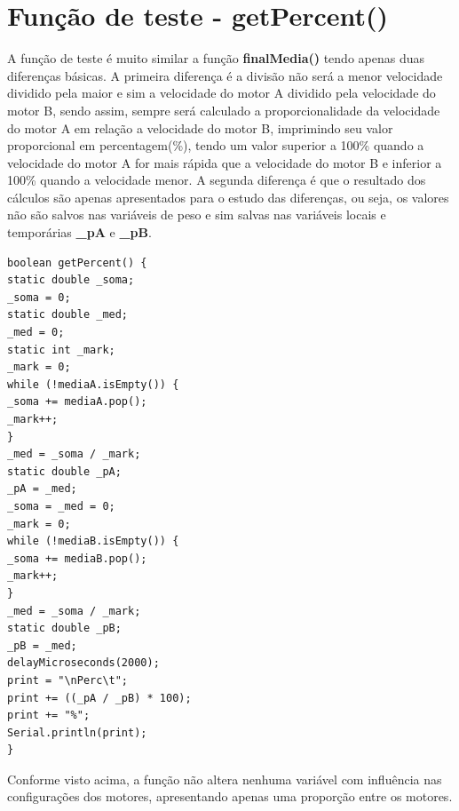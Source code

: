 \documentclass[a4paper,12pt,portuguese]{ufms-cpcx}
\begin{document}
\chapter{Função de teste - getPercent()}\label{getPercent}
A função de teste é muito similar a função \textbf{finalMedia()} tendo apenas duas diferenças básicas. A primeira diferença é a divisão não será a menor velocidade dividido pela maior e sim a velocidade do motor A dividido pela velocidade do motor B, sendo assim, sempre será calculado a proporcionalidade da velocidade do motor A em relação a velocidade do motor B, imprimindo seu valor proporcional em percentagem(\%), tendo um valor superior a 100\% quando a velocidade do motor A for mais rápida que a velocidade do motor B e inferior a 100\% quando a velocidade menor.
A segunda diferença é que o resultado dos cálculos são apenas apresentados para o estudo das diferenças, ou seja, os valores não são salvos nas variáveis de peso e sim salvas nas variáveis locais e temporárias \textbf{\_pA} e \textbf{\_pB}.
\begin{lstlisting}
boolean getPercent() {
static double _soma;
_soma = 0;
static double _med;
_med = 0;
static int _mark;
_mark = 0;
while (!mediaA.isEmpty()) {
_soma += mediaA.pop();
_mark++;
}
_med = _soma / _mark;
static double _pA;
_pA = _med;
_soma = _med = 0;
_mark = 0;
while (!mediaB.isEmpty()) {
_soma += mediaB.pop();
_mark++;
}
_med = _soma / _mark;
static double _pB;
_pB = _med;
delayMicroseconds(2000);
print = "\nPerc\t";
print += ((_pA / _pB) * 100);
print += "%";
Serial.println(print);
}
\end{lstlisting}
Conforme visto acima, a função não altera nenhuma variável com influência nas configurações dos motores, apresentando apenas uma proporção entre os motores.


%
\end{document}
